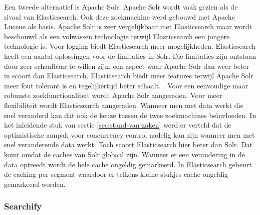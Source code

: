 Een tweede alternatief is Apache Solr. Apache Solr wordt vaak gezien als de rivaal van Elasticsearch. Ook deze zoekmachine werd gebouwd met Apache Lucene als basis. Apache Solr is zeer vergelijkbaar met Elasticsearch maar wordt beschouwd als een volwassen technologie terwijl Elasticsearch een jongere technologie is. Voor logging biedt Elasticsearch meer mogelijkheden. Elasticsearch heeft een aantal oplossingen voor de limitaties in Solr. Die limitaties zijn ontstaan door zeer schaalbaar te willen zijn, een aspect waar Apache Solr dan weer beter in scoort dan Elasticsearch. Elasticsearch biedt meer features terwijl Apache Solr meer fout tolerant is en tegelijkertijd beter schaalt. \autocite{Solr}. Voor een eenvoudige maar robuuste zoekfunctionaliteit wordt Apache Solr aangeraden. Voor meer flexibiliteit wordt Elasticsearch aangeraden. Wanneer men met data werkt die snel veranderd kan dat ook de keuze tussen de twee zoekmachines beïnvloeden. In het inleidende stuk van sectie \ref{sec:stand-van-zaken} werd er verteld dat de optimistische aanpak voor concurrency control nadelig kan zijn wanneer men met snel veranderende data werkt. Toch scoort Elasticsearch hier beter dan Solr. Dat komt omdat de caches van Solr globaal zijn. Wanneer er een verandering in de data optreedt wordt de hele cache ongeldig gemarkeerd. In Elasticsearch gebeurt de caching per segment waardoor er telkens kleine stukjes cache ongeldig gemarkeerd worden.

\subsubsection{Searchify}

